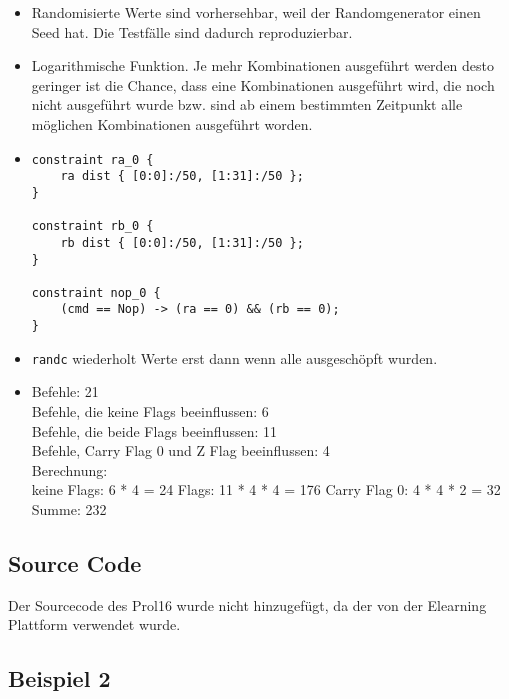 \documentclass[12pt,a4paper]{article}
\begin{document}
\begin{itemize}
	\item Randomisierte Werte sind vorhersehbar, weil der Randomgenerator einen Seed hat. Die Testfälle sind dadurch reproduzierbar.
	\item Logarithmische Funktion. Je mehr Kombinationen ausgeführt werden desto geringer ist die Chance, dass eine Kombinationen ausgeführt wird, die noch nicht ausgeführt wurde bzw. sind ab einem bestimmten Zeitpunkt alle möglichen Kombinationen ausgeführt worden.
	\item
				\begin{lstlisting}[numbers=none]
constraint ra_0 {
	ra dist { [0:0]:/50, [1:31]:/50 };
}
	
constraint rb_0 {
	rb dist { [0:0]:/50, [1:31]:/50 };
}

constraint nop_0 {
	(cmd == Nop) -> (ra == 0) && (rb == 0);
}
				\end{lstlisting}
		
	\item \texttt{randc} wiederholt Werte erst dann wenn alle ausgeschöpft wurden.
	\item Befehle: 21\\
				Befehle, die keine Flags beeinflussen: 6\\
				Befehle, die beide Flags beeinflussen: 11\\
				Befehle, Carry Flag 0 und Z Flag beeinflussen: 4\\
				
				Berechnung:\\
				keine Flags: 6 * 4 = 24
				Flags: 11 * 4 * 4 = 176
				Carry Flag 0: 4 * 4 * 2 = 32
				Summe: 232
				
\end{itemize}

\subsection{Source Code}

Der Sourcecode des Prol16 wurde nicht hinzugefügt, da der von der Elearning Plattform verwendet wurde.







%





\subsection{Beispiel 2}
\end{document}
